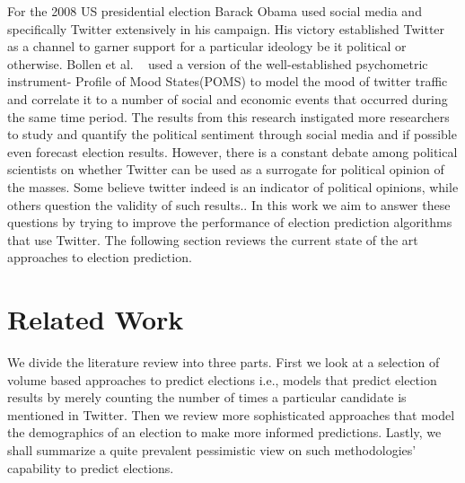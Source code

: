 For the 2008 US presidential election Barack Obama used social media and specifically Twitter extensively in his campaign. 
His victory established Twitter as a channel to garner support for a particular ideology be it political or otherwise.
Bollen et al. ~\cite{bollen2011modeling} used a version of the well-established psychometric instrument- Profile of Mood States(POMS) to model the mood of twitter traffic and correlate it to a number of social and economic events that occurred during the same time period. 
The results from this research instigated more researchers to study and quantify the political sentiment through social media and if possible even forecast election results.
However, there is a constant debate among political scientists on whether Twitter can be used as a surrogate for political opinion of the masses.
Some believe twitter indeed is an indicator of political opinions, while others question the validity of such results.. 
In this work we aim to answer these questions by trying to improve the performance of election prediction algorithms that use Twitter.
The following section reviews the current state of the art approaches to election prediction. 

\section{Related Work}
We divide the literature review into three parts.
First we look at a selection of volume based approaches to predict elections i.e., models that predict election results by merely counting the number of times a particular candidate is mentioned in Twitter.
Then we review more sophisticated approaches that model the demographics of an election to make more informed predictions.
Lastly, we shall summarize a quite prevalent pessimistic view on such methodologies' capability to predict elections.
